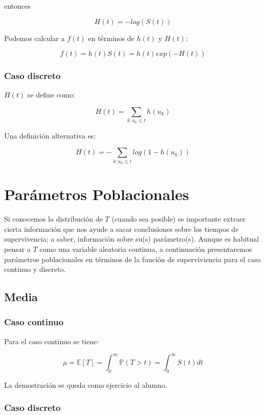 \documentclass[
  a4paper,
  oneside,
  openany]{book}
\begin{document}
entonces

\[
H(t)=-log(S(t))
\]

Podemos calcular a \(f(t)\) en términos de \(h(t)\) y \(H(t)\):

\[
f(t)=h(t)S(t)=h(t)exp(-H(t))
\]

\hypertarget{caso-discreto-2}{%
\subsection*{Caso discreto}\label{caso-discreto-2}}


\(H(t)\) se define como:

\[
H(t)=\sum_{k: u_k\leq t}h(u_k)
\]

Una definición alternativa es:

\[
H(t)=-\sum_{k: u_k\leq t}log(1-h(u_k))
\]

\hypertarget{par-poblacionales}{%
\chapter{Parámetros Poblacionales}\label{par-poblacionales}}

Si conocemos la distribución de \(T\) (cuando sea posible) es importante extraer cierta información que nos ayude a sacar conclusiones sobre los tiempos de supervivencia; a saber, información sobre su(s) parámetro(s). Aunque es habitual pensar a \(T\) como una variable aleatoria continua, a continuación presentaremos parámetros poblacionales en términos de la función de superviviencia para el caso continuo y discreto.

\hypertarget{media}{%
\section{Media}\label{media}}

\hypertarget{caso-continuo-3}{%
\subsection*{Caso continuo}\label{caso-continuo-3}}


Para el caso continuo se tiene:

\[
\mu=\mathbb{E}[T]=\int_{0}^{\infty}\mathbb{P}(T>t)=\int_{0}^{\infty}S(t)dt
\]

La demostración se queda como ejercicio al alumno.

\hypertarget{caso-discreto-3}{%
\subsection*{Caso discreto}\label{caso-discreto-3}}
\end{document}
